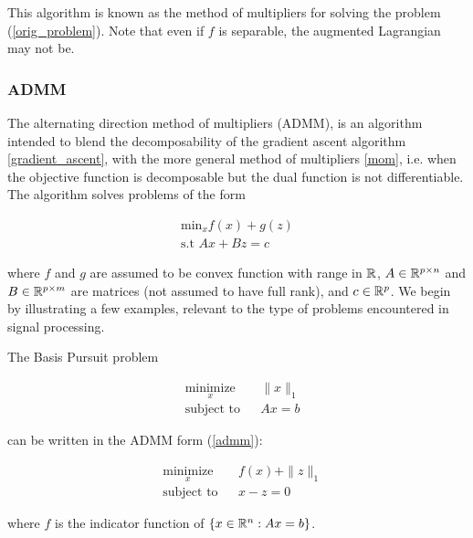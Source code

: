 \documentclass{article}
\begin{document}
This algorithm is known as the method of multipliers for solving the problem (\ref{orig_problem}). Note that even if \(f\) is separable, the augmented Lagrangian may not be.

\subsubsection{ADMM}
The alternating direction method of multipliers (ADMM), is an algorithm intended to blend the decomposability of the gradient ascent algorithm \ref{gradient_ascent}, with the more general method of multipliers \ref{mom}, i.e. when the objective function is decomposable but the dual function is not differentiable. The algorithm solves problems of the form

\begin{align}
\text{min}_{x} f\left( x \right) + g\left(z\right)
\\
\text{s.t } Ax +Bz = c
\label{admm}
\end{align}

where \(f\) and \(g\) are assumed to be convex function with range in \({\mathbb{R}}\), \(A \in {\mathbb{R}}^{p \times n}\) and \(B\in {\mathbb{R}}^{p \times m}\) are matrices (not assumed to have full rank), and \(c \in {\mathbb{R}}^p\). We begin by illustrating a few examples, relevant to the type of problems encountered in signal processing.

\begin{example}
The Basis Pursuit problem

\begin{equation*}
\begin{aligned}
& \underset{x}{\text{minimize}}
& & \|x\|_1 \\
& \text{subject to}
& & Ax = b
\label{bp}
\end{aligned}
\end{equation*}

can be written in the ADMM form (\ref{admm}):

\begin{equation*}
\begin{aligned}
& \underset{x}{\text{minimize}}
& & f\left( x \right) + \|z\|_1 \\
& \text{subject to}
& & x - z = 0
\label{bp_reform}
\end{aligned}
\end{equation*}

where \(f\) is the indicator function of \(\{x\in {\mathbb{R}}^n : Ax = b\}\). 

\end{example} 
\end{document}
